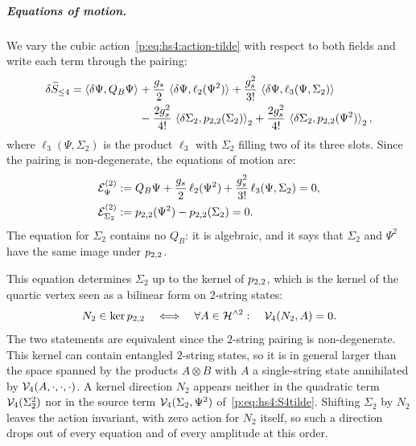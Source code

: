 \subparagraph{Equations of motion.}

We vary the cubic action~\eqref{p:eq:hs4:action-tilde} with respect to both fields and write each term through the pairing:
\begin{equation}
  \label{p:eq:hs4:delta-S}
  \begin{aligned}
    \delta \caction[\le 4]
      = \pair{\delta \Psi}{Q_B \Psi}
        &
        + \frac{\gs}{2} \, \pair{\delta \Psi}{\ell_2(\Psi^2)}
        + \frac{\gs^2}{3!} \, \pair{\delta \Psi}{\ell_3(\Psi, \Sigma_2)}
        \\ &
        - \frac{2 \gs^2}{4!} \, \pair[2]{\delta \Sigma_2}{\sprod{2}{2}(\Sigma_2)}
        + \frac{2 \gs^2}{4!} \, \pair[2]{\delta \Sigma_2}{\sprod{2}{2}(\Psi^2)},
  \end{aligned}
\end{equation}
where $\ell_3(\Psi, \Sigma_2)$ is the product $\ell_3$ with $\Sigma_2$ filling two of its three slots.
Since the pairing is non-degenerate, the equations of motion are:
\begin{subequations}
  \label{p:eq:hs4:eom}
  \begin{align}
    \label{p:eq:hs4:eom-psi}
    \mathcal E^{(2)}_\Psi
      &
      := Q_B \Psi
        + \frac{\gs}{2} \, \ell_2(\Psi^2)
        + \frac{\gs^2}{3!} \, \ell_3(\Psi, \Sigma_2)
      = 0,
    \\
    \label{p:eq:hs4:eom-sigma}
    \mathcal E^{(2)}_{\Sigma_2}
      &
      := \sprod{2}{2}(\Psi^2) - \sprod{2}{2}(\Sigma_2)
      = 0.
  \end{align}
\end{subequations}
The equation for $\Sigma_2$ contains no $Q_B$: it is algebraic, and it says that $\Sigma_2$ and $\Psi^2$ have the same image under $\sprod{2}{2}$.

This equation determines $\Sigma_2$ up to the kernel of $\sprod{2}{2}$, which is the kernel of the quartic vertex seen as a bilinear form on $2$-string states:
\begin{equation}
  \label{p:eq:hs4:kernel}
  N_2 \in \ker \sprod{2}{2}
  \quad \Longleftrightarrow \quad
  \forall A \in \Hn{2}:
  \quad
  \vertex{4}(N_2, A)
    = 0.
\end{equation}
The two statements are equivalent since the $2$-string pairing is non-degenerate.
This kernel can contain entangled $2$-string states, so it is in general larger than the space spanned by the products $A \otimes B$ with $A$ a single-string state annihilated by $\vertex{4}(A, \cdot, \cdot, \cdot)$.
A kernel direction $N_2$ appears neither in the quadratic term $\vertex{4}(\Sigma_2^2)$ nor in the source term $\vertex{4}(\Sigma_2, \Psi^2)$ of~\eqref{p:eq:hs4:S4tilde}.
Shifting $\Sigma_2$ by $N_2$ leaves the action invariant, with zero action for $N_2$ itself, so such a direction drops out of every equation and of every amplitude at this order.

